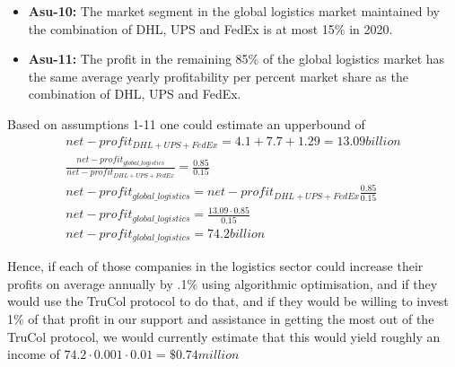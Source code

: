 \begin{itemize}
	\item \textbf{Asu-10:} The market segment in the global logistics market maintained by the combination of DHL, UPS and FedEx is at most 15\% in 2020.
	\item \textbf{Asu-11:} The profit in the remaining 85\% of the global logistics market has the same average yearly profitability per percent market share as the combination of DHL, UPS and FedEx.
\end{itemize}

Based on assumptions 1-11 one could estimate an upperbound of 
\begin{equation}
	\begin{split}
		net-profit_{DHL+UPS+FedEx}=4.1+7.7+1.29=13.09 billion\\
		\frac{net-profit_{global\_logistics}}{net-profit_{DHL+UPS+FedEx}}=\frac{0.85}{0.15}\\
		net-profit_{global\_logistics}=net-profit_{DHL+UPS+FedEx}\frac{0.85}{0.15}\\
		net-profit_{global\_logistics}=\frac{13.09\cdot0.85}{0.15}\\
		net-profit_{global\_logistics}=74.2 billion
	\end{split}
\end{equation}

Hence, if each of those companies in the logistics sector could increase their profits on average annually by .1\% using algorithmic optimisation, and if they would use the TruCol protocol to do that, and if they would be willing to invest 1\% of that profit in our support and assistance in getting the most out of the TruCol protocol, we would currently estimate that this would yield roughly an income of $74.2\cdot 0.001\cdot 0.01=\$0.74 million$

